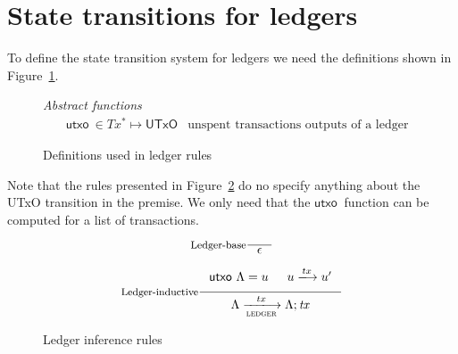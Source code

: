\documentclass[11pt,a4paper]{article}
\newcommand{\var}[1]{\mathit{#1}}
\newcommand{\fun}[1]{\mathsf{#1}}
\newcommand{\type}[1]{\mathsf{#1}}
\newcommand{\trans}[2]{\xlongrightarrow[\textsc{#1}]{#2}}
\newcommand{\seqof}[1]{#1^{*}}
\newcommand{\UTxO}{\type{UTxO}}
\newcommand{\utxo}[1]{\fun{utxo}\ #1}
\begin{document}
\section{State transitions for ledgers}
\label{sec:state-trans-ledg}

To define the state transition system for ledgers we need the definitions
shown in Figure~\ref{fig:ledger-rules-defs}.

\begin{figure}[h]
  \emph{Abstract functions}
  \begin{align*}
    & \utxo{} \in \seqof{Tx} \mapsto \UTxO
      & \text{unspent transactions outputs of a ledger}
  \end{align*}
  \caption{Definitions used in ledger rules}
  \label{fig:ledger-rules-defs}
\end{figure}

Note that the rules presented in Figure~\ref{fig:ledger-rules} do no specify
anything about the UTxO transition in the premise. We only need that the
$\utxo{}$ function can be computed for a list of transactions.

\begin{figure}[h]
  \begin{equation}
    \label{eq:ledger-base}
    \inference[Ledger-base]
    {}
    {\epsilon}
  \end{equation}

  \begin{equation}
    \label{eq:ledger-indutive}
    \inference[Ledger-inductive]
    {\utxo{\Lambda} = u & u \trans{}{tx} u' }
    {\Lambda \trans{ledger}{tx}{\Lambda; \var{tx}}}
  \end{equation}
  \caption{Ledger inference rules}
  \label{fig:ledger-rules}
\end{figure}
\end{document}
